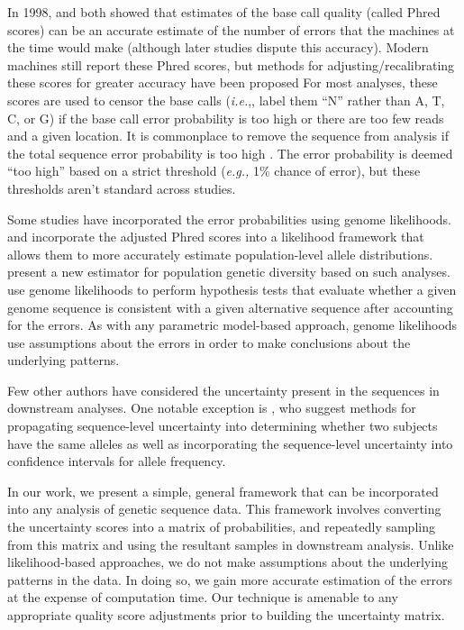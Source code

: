 \documentclass[
]{article}
\newcommand{\eg}{\textit{e.g.,}\xspace}
\newcommand{\ie}{\textit{i.e.},\xspace}
\begin{document}
In 1998, \citet{ewingBaseCallingAutomatedSequencer1998} and
\citet{richterichEstimationErrorsRaw1998} both showed that estimates of
the base call quality (called Phred scores) can be an accurate estimate
of the number of errors that the machines at the time would make
(although later studies dispute this accuracy). Modern machines still
report these Phred scores, but methods for adjusting/recalibrating these
scores for greater accuracy have been proposed
\citep[\citet{depristoFrameworkVariationDiscovery2011},
\citet{liSNPDetectionMassively2009}]{liAdjustQualityScores2004} For most
analyses, these scores are used to censor the base calls (\ie, label
them ``N'' rather than A, T, C, or G) if the base call error probability
is too high or there are too few reads and a given location. It is
commonplace to remove the sequence from analysis if the total sequence
error probability is too high \citep[see,
\eg ][\citet{robaskyRoleReplicatesError2014},
\citet{oraweAccountingUncertaintyDNA2015}]{doroninaPhylogeneticPositionEmended2005}.
The error probability is deemed ``too high'' based on a strict threshold
(\eg 1\% chance of error), but these thresholds aren't standard across
studies.

Some studies have incorporated the error probabilities using genome
likelihoods. \citet{depristoFrameworkVariationDiscovery2011} and
\citet{gompertHierarchicalBayesianModel2011} incorporate the adjusted
Phred scores into a likelihood framework that allows them to more
accurately estimate population-level allele distributions.
\citet{fumagalliQuantifyingPopulationGenetic2013a} present a new
estimator for population genetic diversity based on such analyses.
\citet{kuoEAGLEExplicitAlternative2018} use genome likelihoods to
perform hypothesis tests that evaluate whether a given genome sequence
is consistent with a given alternative sequence after accounting for the
errors. As with any parametric model-based approach, genome likelihoods
use assumptions about the errors in order to make conclusions about the
underlying patterns.

Few other authors have considered the uncertainty present in the
sequences in downstream analyses. One notable exception is
\citet{oraweAccountingUncertaintyDNA2015}, who suggest methods for
propagating sequence-level uncertainty into determining whether two
subjects have the same alleles as well as incorporating the
sequence-level uncertainty into confidence intervals for allele
frequency.

In our work, we present a simple, general framework that can be
incorporated into any analysis of genetic sequence data. This framework
involves converting the uncertainty scores into a matrix of
probabilities, and repeatedly sampling from this matrix and using the
resultant samples in downstream analysis. Unlike likelihood-based
approaches, we do not make assumptions about the underlying patterns in
the data. In doing so, we gain more accurate estimation of the errors at
the expense of computation time. Our technique is amenable to any
appropriate quality score adjustments prior to building the uncertainty
matrix.
\end{document}
